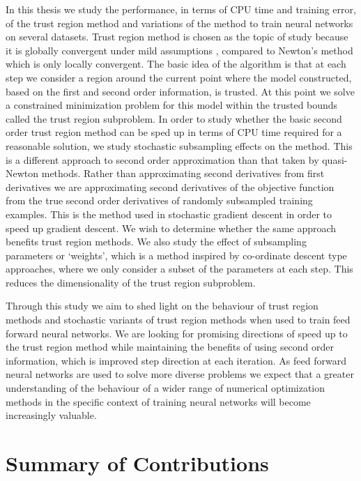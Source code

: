 \documentclass[letterpaper,12pt,titlepage,oneside,final]{book}
\begin{document}
	In this thesis we study the performance, in terms of CPU time and training error, of the trust region method and variations of the method to train neural networks on several datasets. Trust region method is chosen as the topic of study because it is globally convergent under mild assumptions \cite{shultz1985family}, compared to Newton's method which is only locally convergent. The basic idea of the algorithm is that at each step we consider a region around the current point where the model constructed, based on the first and second order information, is trusted. At this point we solve a constrained minimization problem for this model within the trusted bounds called the trust region subproblem. In order to study whether the basic second order trust region method can be sped up in terms of CPU time required for a reasonable solution, we study stochastic subsampling effects on the method. This is a different approach to second order approximation than that taken by quasi-Newton methods. Rather than approximating second derivatives from first derivatives we are approximating second derivatives of the objective function from the true second order derivatives of randomly subsampled training examples. This is the method used in stochastic gradient descent in order to speed up gradient descent. We wish to determine whether the same approach benefits trust region methods. We also study the effect of subsampling parameters or `weights', which is a method inspired by co-ordinate descent type approaches, where we only consider a subset of the parameters at each step. This reduces the dimensionality of the trust region subproblem.
	
	Through this study we aim to shed light on the behaviour of trust region methods and stochastic variants of trust region methods when used to train feed forward neural networks. We are looking for promising directions of speed up to the trust region method while maintaining the benefits of using second order information, which is improved step direction at each iteration. As feed forward neural networks are used to solve more diverse problems we expect that a greater understanding of the behaviour of a wider range of numerical optimization methods in the specific context of training neural networks will become increasingly valuable.
	
	\section{Summary of Contributions}
	
\end{document}
